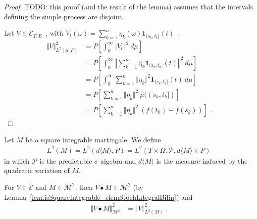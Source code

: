 \begin{proof}
TODO: this proof (and the result of the lemma) assumes that the intervals defining the simple process are disjoint.

Let $V \in \mathcal{E}_{T, E}$~, with $V_t(\omega) = \sum_{k=1}^n \eta_k(\omega) \mathbf{1}_{(s_k, t_k]}(t)$~.
\begin{align*}
  \Vert V \Vert^2_{L^2(\mu, P)}
  &= P\left[ \int_0^{\infty} \Vert V_t \Vert^2 \: d\mu \right]
  \\
  &= P\left[ \int_0^{\infty} \left\Vert \sum_{k=1}^n \eta_k \mathbf{1}_{(s_k, t_k]}(t) \right\Vert^2 \: d\mu \right]
  \\
  &= P\left[ \int_0^{\infty} \sum_{k=1}^n \Vert \eta_k \Vert^2 \mathbf{1}_{(s_k, t_k]}(t) \: d\mu \right]
  \\
  &= P\left[ \sum_{k=1}^n \Vert \eta_k \Vert^2 \: \mu((s_k, t_k]) \right]
  \\
  &= P\left[ \sum_{k=1}^n \Vert \eta_k \Vert^2 \: (f(t_k) - f(s_k)) \right]
  \: .
\end{align*}
\end{proof}


\begin{definition}\label{def:L2M}
Let $M$ be a square integrable martingale. We define
\begin{align*}
  L^2(M)
  = L^2(d\langle M \rangle, P)
  = L^2(T \times \Omega, \mathcal{P}, d\langle M \rangle \times P)
\end{align*}
in which $\mathcal{P}$ is the predictable $\sigma$-algebra and $d\langle M \rangle$ is the measure induced by the quadratic variation of $M$.
\end{definition}


\begin{lemma}\label{lem:sq_norm_elemStochIntegral}
For $V \in \mathcal{E}$ and $M \in \mathcal{M}^2$, then $V \bullet M \in \mathcal{M}^2$ (by Lemma~\ref{lem:isSquareIntegrable_elemStochIntegralBilin}) and
\begin{align*}
  \Vert V \bullet M \Vert_{\mathcal{M}^2}^2
  &= \Vert V \Vert_{L^2(M)}^2
  \: .
\end{align*}
\end{lemma}

